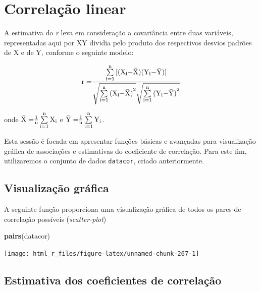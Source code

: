 \documentclass[
]{book}
\makeatletter
\newenvironment{Shaded}{\begin{snugshade}}{\end{snugshade}}
\newcommand{\KeywordTok}[1]{\textcolor[rgb]{0.13,0.29,0.53}{\textbf{#1}}}
\newcommand{\NormalTok}[1]{#1}
\numberwithin{equation}{section}
\newcommand{\indf}[1]{\index[function]{#1@\texttt{#1()}|ST}}
\makeatother
\begin{document}
\hypertarget{correlauxe7uxe3o-linear}{%
\section{Correlação linear}\label{correlauxe7uxe3o-linear}}

A estimativa do \emph{r} leva em consideração a covariância entre duas variáveis, representadas aqui por XY dividia pelo produto dos respectivos desvios padrões de X e de Y, conforme o seguinte modelo:

\[
{\rm{r  =  }}\frac{{\sum\limits_{{\rm{i = 1}}}^{\rm{n}} {{\rm{[ (}}{{\rm{X}}_{\rm{i}}}{\rm{ - \bar X)(}}{{\rm{Y}}_{\rm{i}}}{\rm{ - \bar Y)] }}} }}{{\sqrt {\sum\limits_{{\rm{i = 1}}}^{\rm{n}} {{{{\rm{(}}{{\rm{X}}_{\rm{i}}}{\rm{ - \bar X)}}}^{\rm{2}}}} } \sqrt {\sum\limits_{{\rm{i = 1}}}^{\rm{n}} {{{{\rm{(}}{{\rm{Y}}_{\rm{i}}}{\rm{ - \bar Y)}}}^{\rm{2}}}} } }}
\]

onde \({\rm{\bar X = }}\frac{{\rm{1}}}{{\rm{n}}}\sum\limits_{{\rm{i = 1}}}^{\rm{n}} {{{\rm{X}}_{\rm{i}}}}\) e \({\rm{\bar Y = }}\frac{{\rm{1}}}{{\rm{n}}}\sum\limits_{{\rm{i = 1}}}^{\rm{n}} {{{\rm{Y}}_{\rm{i}}}}\).

Esta sessão é focada em apresentar funções básicas e avançadas para visualização gráfica de associações e estimativas do coeficiente de correlação. Para este fim, utilizaremos o conjunto de dados \texttt{datacor}, criado anteriormente.

\hypertarget{visualizauxe7uxe3o-gruxe1fica}{%
\subsection{Visualização gráfica}\label{visualizauxe7uxe3o-gruxe1fica}}

A seguinte função proporciona uma visualização gráfica de todos os pares de correlação possíveis (\emph{scatter-plot})
\indf{pairs}

\begin{Shaded}
\begin{Highlighting}[]
\KeywordTok{pairs}\NormalTok{(datacor)}
\end{Highlighting}
\end{Shaded}

\begin{center}\texttt{[image: html\_r\_files/figure-latex/unnamed-chunk-267-1]} \end{center}

\hypertarget{estimativa-dos-coeficientes-de-correlauxe7uxe3o}{%
\subsection{Estimativa dos coeficientes de correlação}\label{estimativa-dos-coeficientes-de-correlauxe7uxe3o}}
\end{document}
